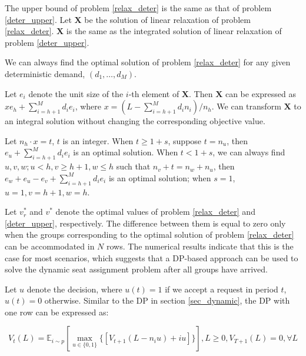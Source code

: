 \begin{lem}
  The upper bound of problem \eqref{relax_deter} is the same as that of problem \eqref{deter_upper}. Let $\mathbf{X}$ be the solution of linear relaxation of problem \eqref{relax_deter}. $\mathbf{X}$ is the same as the integrated solution of linear relaxation of problem \eqref{deter_upper}.
\end{lem}


We can always find the optimal solution of problem \eqref{relax_deter} for any given deterministic demand, $(d_{1}, \ldots, d_{M})$.

Let $e_{i}$ denote the unit size of the $i$-th element of $\mathbf{X}$. Then $\mathbf{X}$ can be expressed as $x e_{h} + \sum_{i=h+1} ^{M} d_{i} e_{i}$, where $x = (L- \sum_{i = h+1}^{M} {d_i n_i})/ n_h$. We can transform $\mathbf{X}$ to an integral solution without changing the corresponding objective value.

Let $n_h \cdot x = t$, $t$ is an integer. When $t \geq 1+s$, suppose $t = n_{u}$, then $e_{u} + \sum_{i=h+1} ^{M} d_{i} e_{i}$ is an optimal solution. When $t < 1+s$, we can always find $u,v,w; u<h, v \geq h+1, w \leq h$ such that $n_{v} + t = n_{w} + n_{u}$, then $e_{w} + e_{u} -e_{v} + \sum_{i=h+1} ^{M} d_{i} e_{i}$ is an optimal solution; when $s=1$, $u = 1, v = h+1, w =h$. 


Let $v_{r}^{*}$ and $v^{*}$ denote the optimal values of problem \eqref{relax_deter} and \eqref{deter_upper}, respectively. The difference between them is equal to zero only when the groups corresponding to the optimal solution of problem \eqref{relax_deter} can be accommodated in $N$ rows. The numerical results indicate that this is the case for most scenarios, which suggests that a DP-based approach can be used to solve the dynamic seat assignment problem after all groups have arrived.



Let $u$ denote the decision, where $u(t) = 1$ if we accept a request in period $t$, $u(t) =0$ otherwise. Similar to the DP in section \ref{sec_dynamic}, the DP with one row can be expressed as:

$$V_{t}(L) = \mathbb{E}_{i \sim p} [\max_{u \in \{0,1\}} \{ {[V_{t+1}(L-n_i u)+ i u]}\}], L \geq 0, V_{T+1}(L) =0, \forall L$$

